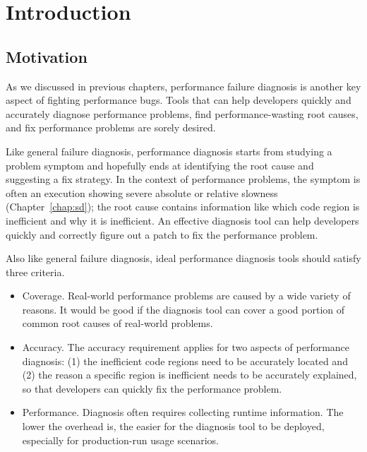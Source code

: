 \section{Introduction}
\label{sec:6_intro}
\subsection{Motivation}

As we discussed in previous chapters, 
performance failure diagnosis is another key aspect of fighting performance bugs.
Tools that can help
developers quickly and accurately diagnose performance problems,
find performance-wasting root causes, and fix performance problems
are sorely desired. 

Like general failure diagnosis, 
performance diagnosis starts from studying a problem symptom and hopefully ends
at identifying the root cause and suggesting a fix strategy. 
In the context of performance problems,
the symptom is often
an execution showing severe absolute or
relative slowness (Chapter~\ref{chap:sd}); the root cause contains 
information like which code region is inefficient and why
it is inefficient. An effective diagnosis tool can help developers quickly
and correctly figure out a patch to fix the performance problem.

Also like general failure diagnosis, ideal performance diagnosis tools should
satisfy three criteria.
\begin{itemize}
\item Coverage. 
Real-world performance problems are caused by a wide variety of reasons. It 
would be good if the diagnosis tool can cover a good portion of common
root causes of real-world problems.

\item Accuracy. 
The accuracy requirement applies for two aspects of performance diagnosis: (1)
the inefficient code regions need to be accurately located and (2)
the reason a specific region is inefficient needs to be accurately
explained, so that developers can quickly fix the performance problem.

\item Performance. 
Diagnosis often requires collecting runtime information. The lower the overhead
is, the easier for the diagnosis tool to be deployed, especially for 
production-run usage scenarios. 
\end{itemize}

